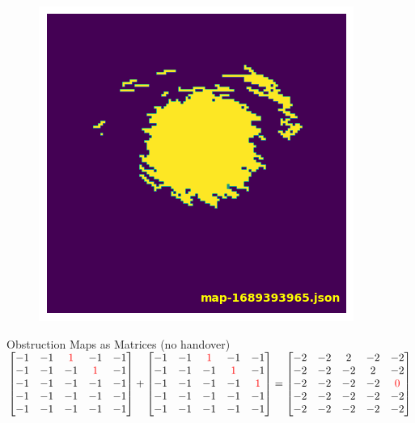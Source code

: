 \documentclass[NET,english,beameralt]{tumbeamer}
\begin{document}
\begin{frame}[fragile]
    \begin{figure}
        \includegraphics[width=0.4\columnwidth]{pics/map4.png}
    \end{figure}
\end{frame}


\begin{frame}{Obstruction Maps as Matrices (no handover)}
    $\begin{bmatrix}
        -1 & -1 & \color{red}1 &           -1 & -1 \\
        -1 & -1 &           -1 & \color{red}1 & -1 \\
        -1 & -1 &           -1 &           -1 & -1 \\
        -1 & -1 &           -1 &           -1 & -1 \\
        -1 & -1 &           -1 &           -1 & -1 \\ 
        \end{bmatrix}
        +
        \begin{bmatrix}
        -1 & -1 & \color{red}1 &           -1 &           -1 \\
        -1 & -1 &           -1 & \color{red}1 &           -1 \\
        -1 & -1 &           -1 &           -1 & \color{red}1 \\
        -1 & -1 &           -1 &           -1 &           -1 \\
        -1 & -1 &           -1 &           -1 &           -1 \\
        \end{bmatrix}
        =
        \begin{bmatrix}
        -2 & -2 & 2 &  -2 &           -2 \\
        -2 & -2 & -2 &  2 &           -2 \\
        -2 & -2 & -2 & -2 & \color{red}0 \\
        -2 & -2 & -2 & -2 &            -2 \\
        -2 & -2 & -2 & -2 &            -2 \\
    \end{bmatrix}$

    \vspace{5mm}
    
\end{frame}
\end{document}
